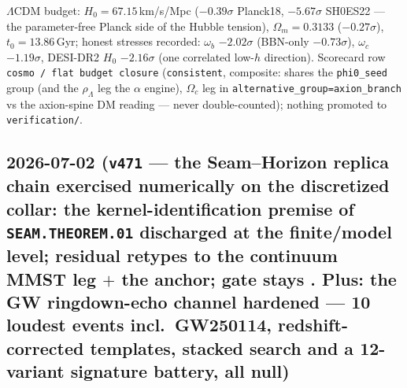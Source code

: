 \begin{itemize}[leftmargin=1.5em]
$\Lambda$CDM budget: $H_0=67.15$\,km/s/Mpc ($-0.39\sigma$ Planck18, $-5.67\sigma$ SH0ES22 --- the
parameter-free Planck side of the Hubble tension), $\Omega_m=0.3133$ ($-0.27\sigma$), $t_0=13.86$\,Gyr;
honest stresses recorded: $\omega_b$ $-2.02\sigma$ (BBN-only $-0.73\sigma$), $\omega_c$ $-1.19\sigma$,
DESI-DR2 $H_0$ $-2.16\sigma$ (one correlated low-$h$ direction). Scorecard row \texttt{cosmo / flat budget
closure} (\texttt{consistent}, composite: shares the \texttt{phi0\_seed} group (and the $\rho_\Lambda$ leg
the $\alpha$ engine), $\Omega_c$ leg in \texttt{alternative\_group=axion\_branch} vs the axion-spine DM
reading --- never double-counted); nothing promoted to \texttt{verification/}.
\end{itemize}

\subsection*{2026-07-02 (\texttt{v471} --- the Seam--Horizon replica chain exercised numerically on the discretized collar: the kernel-identification premise of \texttt{SEAM.THEOREM.01} discharged at the finite/model level; residual retypes to the continuum MMST leg $+$ the anchor; gate stays \mO. Plus: the GW ringdown-echo channel hardened --- 10 loudest events incl.\ GW250114, redshift-corrected templates, stacked search and a 12-variant signature battery, all null)}

